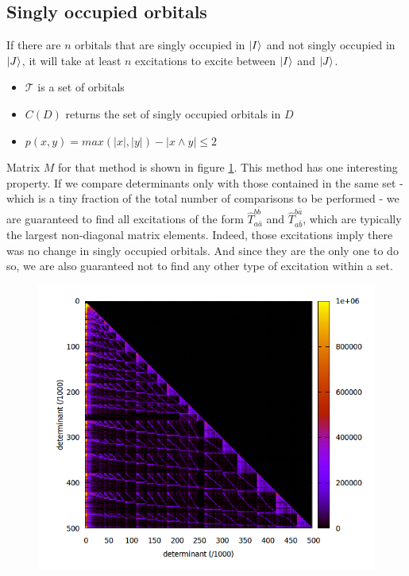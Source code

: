 \documentclass[./thesis.tex]{subfiles}
\begin{document}
\subsection{Singly occupied orbitals}
If there are $n$ orbitals that are singly occupied in $\ket I$ and not singly occupied in $\ket J$, it will take at least $n$ excitations to excite between $\ket I$ and $\ket J$.

\begin{itemize}
	\item
$\mathcal{T}$ is a set of orbitals
	\item
$C(D)$ returns the set of singly occupied orbitals in $D$
	\item
$p(x, y) = max (|x|, |y|) - |x \wedge y| \leq 2$
\end{itemize}

Matrix $M$ for that method is shown in figure \ref{fig:xor_subspace}.
This method has one interesting property. If we compare determinants only with those contained in the same set - which is a tiny fraction of the total number of comparisons to be performed - we are guaranteed to find all excitations of the form $\hat T_{a \bar a}^{b \bar b}$ and $\hat T_{a \bar b}^{b \bar a}$, which are typically the largest non-diagonal matrix elements. Indeed, those excitations imply there was no change in singly occupied orbitals. And since they are the only one to do so, we are also guaranteed not to find any other type of excitation within a set.

\begin{figure}[H]
	\begin{center}
		\includegraphics[width=0.6\columnwidth]{figures/davidson/xor_subspace}
		\caption{{\label{fig:xor_subspace}
		}}
	\end{center}
\end{figure}
\end{document}

